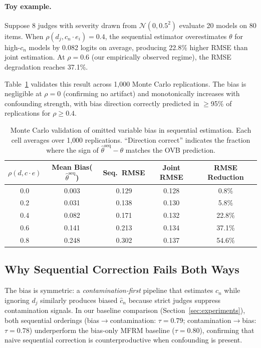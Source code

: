 \documentclass[11pt]{article}
\newcommand{\ei}{e_i}
\newcommand{\cn}{c_n}
\newcommand{\djud}{d_j}
\begin{document}
\paragraph{Toy example.} Suppose 8 judges with severity drawn from $\mathcal{N}(0, 0.5^2)$ evaluate 20 models on 80 items. When $\rho(\djud, \cn \cdot \ei) = 0.4$, the sequential estimator overestimates $\theta$ for high-$\cn$ models by 0.082 logits on average, producing 22.8\% higher RMSE than joint estimation. At $\rho = 0.6$ (our empirically observed regime), the RMSE degradation reaches 37.1\%.

Table~\ref{tab:ovb-mc} validates this result across 1{,}000 Monte Carlo replications. The bias is negligible at $\rho = 0$ (confirming no artifact) and monotonically increases with confounding strength, with bias direction correctly predicted in $\geq$95\% of replications for $\rho \geq 0.4$.

\begin{table}[t]
\centering
\caption{Monte Carlo validation of omitted variable bias in sequential estimation. Each cell averages over 1{,}000 replications. ``Direction correct'' indicates the fraction where the sign of $\hat\theta^{\text{seq}} - \theta$ matches the OVB prediction.}
\label{tab:ovb-mc}
\small
\begin{tabular}{@{}ccccc@{}}
\toprule
$\rho(d,c \cdot e)$ & Mean Bias($\hat\theta^{\text{seq}}$) & Seq.\ RMSE & Joint RMSE & RMSE Reduction \\
\midrule
0.0 & 0.003 & 0.129 & 0.128 & 0.8\% \\
0.2 & 0.031 & 0.138 & 0.130 & 5.8\% \\
0.4 & 0.082 & 0.171 & 0.132 & 22.8\% \\
0.6 & 0.141 & 0.213 & 0.134 & 37.1\% \\
0.8 & 0.248 & 0.302 & 0.137 & 54.6\% \\
\bottomrule
\end{tabular}
\end{table}

\subsection{Why Sequential Correction Fails Both Ways}

The bias is symmetric: a \emph{contamination-first} pipeline that estimates $\cn$ while ignoring $\djud$ similarly produces biased $\hat{c}_n$ because strict judges suppress contamination signals. In our baseline comparison (Section~\ref{sec:experiments}), both sequential orderings (bias$\to$contamination: $\tau = 0.79$; contamination$\to$bias: $\tau = 0.78$) underperform the bias-only MFRM baseline ($\tau = 0.80$), confirming that naive sequential correction is counterproductive when confounding is present.
\end{document}
